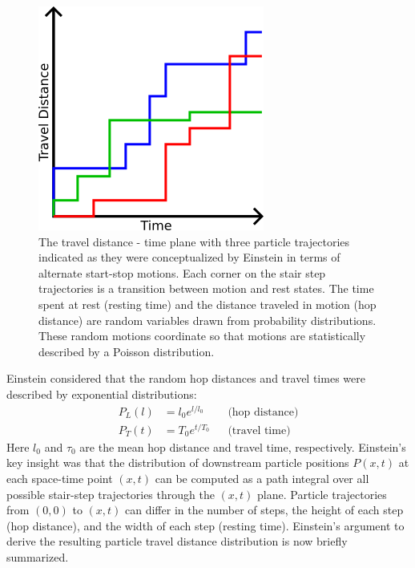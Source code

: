 \begin{figure}
  \includegraphics[width=.98\linewidth]{./figures/einsteintrajectories.png}
  \caption{The travel distance - time plane with three particle trajectories indicated as they were conceptualized by Einstein in terms of alternate start-stop motions. Each corner on the stair step trajectories is a transition between motion and rest states. The time spent at rest (resting time) and the distance traveled in motion (hop distance) are random variables drawn from probability distributions. These random motions coordinate so that motions are statistically described by a Poisson distribution.}
  \label{fig:einsteinTrajectories}
\end{figure}

Einstein considered that the random hop distances and travel times were described by exponential distributions: 
\begin{align}
P_L(l) &= l_0 e^{l/l_0} && \text{(hop distance)} \label{eq:hop}\\
P_T(t) &= T_0 e^{t/T_0} && \text{(travel time)} \label{eq:rest}
\end{align}
Here $l_0$ and $\tau_0$ are the mean hop distance and travel time, respectively.  
Einstein's key insight was that the distribution of downstream particle positions $P(x,t)$ at each space-time point $(x,t)$ can be computed as a path integral over all possible stair-step trajectories through the $(x,t)$ plane. 
Particle trajectories from $(0,0)$ to $(x,t)$ can differ in the number of steps, the height of each step (hop distance), and the width of each step (resting time). 
Einstein's argument to derive the resulting particle travel distance distribution is now briefly summarized. 

